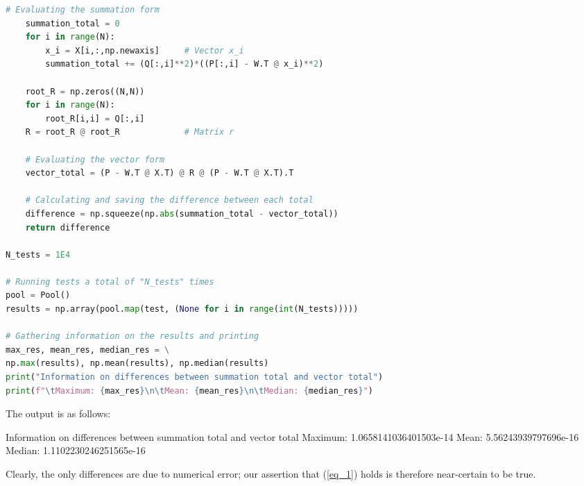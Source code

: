 \documentclass[a4paper,10pt,english]{article}
\begin{document}
\begin{multicols*}{2}
\begin{lstlisting}[showstringspaces=false,language=Python,numbers=none]
    # Evaluating the summation form
    summation_total = 0
    for i in range(N):
        x_i = X[i,:,np.newaxis]     # Vector x_i
        summation_total += (Q[:,i]**2)*((P[:,i] - W.T @ x_i)**2)

    root_R = np.zeros((N,N))
    for i in range(N):
        root_R[i,i] = Q[:,i]
    R = root_R @ root_R             # Matrix r

    # Evaluating the vector form
    vector_total = (P - W.T @ X.T) @ R @ (P - W.T @ X.T).T

    # Calculating and saving the difference between each total
    difference = np.squeeze(np.abs(summation_total - vector_total))
    return difference

N_tests = 1E4

# Running tests a total of "N_tests" times
pool = Pool()
results = np.array(pool.map(test, (None for i in range(int(N_tests)))))

# Gathering information on the results and printing
max_res, mean_res, median_res = \
np.max(results), np.mean(results), np.median(results)
print("Information on differences between summation total and vector total")
print(f"\tMaximum: {max_res}\n\tMean: {mean_res}\n\tMedian: {median_res}")
\end{lstlisting}

The output is as follows:

\begin{terminal}

Information on differences between summation total and vector total
	Maximum: 1.0658141036401503e-14
	Mean: 5.56243939797696e-16
	Median: 1.1102230246251565e-16
\end{terminal}

Clearly, the only differences are due to numerical error; our assertion that (\ref{eq_1}) holds is therefore near-certain to be true.

\end{multicols*}
\end{document}
